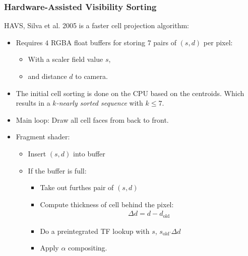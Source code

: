 \subsubsection{Hardware-Assisted Visibility Sorting}
HAVS, Silva et al. 2005 is a faster cell projection algorithm:
\begin{itemize}
    \item Requires $4$ RGBA float buffers for storing $7$ pairs of $(s,d)$ per pixel:
        \begin{itemize}
            \item With a scaler field value $s$,
            \item and distance $d$ to camera.
        \end{itemize}
    \item The initial cell sorting is done on the CPU based on the centroids. Which results in a
        \emph{$k$-nearly sorted sequence} with $k\leq 7$.
    \item Main loop: Draw all cell faces from back to front.
    \item Fragment shader:
        \begin{itemize}
            \item Insert $(s,d)$ into buffer
            \item If the buffer is full:
                \begin{itemize}
                    \item Take out furthes pair of $(s,d)$
                    \item Compute thickness of cell behind the pixel:
                        \begin{align*}
                            \Delta d = d-d_\text{old}
                        \end{align*}
                    \item Do a preintegrated TF lookup with $s$, $s_\text{old'}\Delta d$
                    \item Apply $\alpha$ compositing.
                \end{itemize}
        \end{itemize}
\end{itemize}















